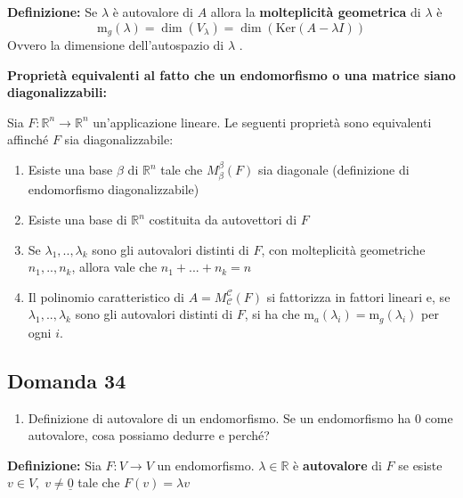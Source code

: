 \documentclass[
  a4paper,
]{article}
\providecommand{\tightlist}{%
  \setlength{\itemsep}{0pt}\setlength{\parskip}{0pt}}
\providecommand{\tightlist}{}
\begin{document}
\textbf{Definizione:} Se \(\lambda\) è autovalore di \(A\) allora la
\textbf{molteplicità geometrica} di \(\lambda\) è \[
\text{m}_g(\lambda) = \dim(V_\lambda) = \dim(\text{Ker}(A - \lambda I))
\] Ovvero la dimensione dell'autospazio di \(\lambda\) .

\bigskip

\textbf{Proprietà equivalenti al fatto che un endomorfismo o una matrice
siano diagonalizzabili:}

Sia \(F : \mathbb{R}^n \to \mathbb{R}^n\) un'applicazione lineare. Le
seguenti proprietà sono equivalenti affinché \(F\) sia diagonalizzabile:

\begin{enumerate}
\def\labelenumi{\arabic{enumi}.}
\tightlist
\item
  Esiste una base \(\beta\) di \(\mathbb{R}^n\) tale che
  \(M^{{\beta}}_{\beta}(F)\) sia diagonale (definizione di endomorfismo
  diagonalizzabile)
\item
  Esiste una base di \(\mathbb{R}^n\) costituita da autovettori di \(F\)
\item
  Se \(\lambda_1, .., \lambda_k\) sono gli autovalori distinti di \(F\),
  con molteplicità geometriche \(n_1, .., n_k\), allora vale che
  \(n_1 + ... + n_k = n\)
\item
  Il polinomio caratteristico di
  \(A = M^{{\mathcal{C}}}_{\mathcal{C}}(F)\) si fattorizza in fattori
  lineari e, se \(\lambda_1, .., \lambda_k\) sono gli autovalori
  distinti di \(F\), si ha che
  \(\text{m}_a(\lambda_i) = \text{m}_g(\lambda_i)\) per ogni \(i\).
\end{enumerate}

\hypertarget{domanda-34}{%
\subsection{Domanda 34}\label{domanda-34}}

\begin{observationbox}[Domanda]
\begin{enumerate}
\def\labelenumi{\arabic{enumi}.}
\setcounter{enumi}{33}
\tightlist
\item
  Definizione di autovalore di un endomorfismo. Se un endomorfismo ha 0
  come autovalore, cosa possiamo dedurre e perché?
\end{enumerate}
\end{observationbox}

\textbf{Definizione:} Sia \(F: V \to V\) un endomorfismo.
\(\lambda \in \mathbb{R}\) è \textbf{autovalore} di \(F\) se esiste
\(v \in V, \;v \not = \underline{0}\) tale che \(F(v) = \lambda v\)
\end{document}
